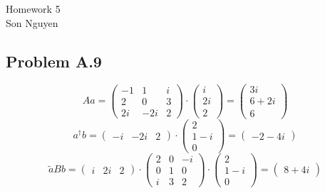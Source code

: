 \documentclass{article}
\begin{document}
\begin{center}
    \LARGE{Homework 5}\\[1em]
    \large Son Nguyen\\[1em]
\end{center}
\subsection*{Problem A.9}
\begin{equation*}
    Aa = 
    \begin{pmatrix}
        -1 & 1 & i \\
        2 & 0 & 3 \\
        2i & -2i & 2
    \end{pmatrix}
    \cdot
    \begin{pmatrix}
        i \\
        2i \\
        2
    \end{pmatrix}
    = 
    \begin{pmatrix}
        3i \\
        6 + 2i \\
        6
    \end{pmatrix}
\end{equation*}
\begin{equation*}
    a^\dagger b =
    \begin{pmatrix}
        -i & -2i & 2 
    \end{pmatrix}
    \cdot 
    \begin{pmatrix}
        2 \\
        1-i \\
        0
    \end{pmatrix}
    = 
    \begin{pmatrix}
        -2-4i
    \end{pmatrix}
\end{equation*}
\begin{equation*}
    \tilde{a}Bb = 
    \begin{pmatrix}
        i & 2i & 2
    \end{pmatrix}
    \cdot 
    \begin{pmatrix}
        2 & 0 & -i \\
        0 & 1 & 0 \\
        i & 3 & 2 
    \end{pmatrix}
    \cdot
    \begin{pmatrix}
        2 \\
        1-i \\
        0
    \end{pmatrix}
    =
    \begin{pmatrix}
        8+4i
    \end{pmatrix}
\end{equation*}
\end{document}
